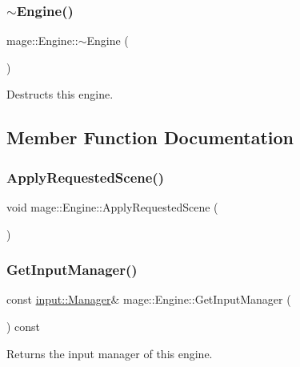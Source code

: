 \subsubsection{\texorpdfstring{$\sim$\+Engine()}{~Engine()}}
{\footnotesize\ttfamily mage\+::\+Engine\+::$\sim$\+Engine (\begin{DoxyParamCaption}{ }\end{DoxyParamCaption})}

Destructs this engine. 

\subsection{Member Function Documentation}
\hypertarget{classmage_1_1_engine_a4fcb9760814dfa59c9fff34f1c82357b}{}\label{classmage_1_1_engine_a4fcb9760814dfa59c9fff34f1c82357b} 
\subsubsection{\texorpdfstring{Apply\+Requested\+Scene()}{ApplyRequestedScene()}}
{\footnotesize\ttfamily void mage\+::\+Engine\+::\+Apply\+Requested\+Scene (\begin{DoxyParamCaption}{ }\end{DoxyParamCaption})\hspace{0.3cm}{\ttfamily [private]}}

\hypertarget{classmage_1_1_engine_ae5b542540511190eb6d284bf3e6ab54c}{}\label{classmage_1_1_engine_ae5b542540511190eb6d284bf3e6ab54c} 
\subsubsection{\texorpdfstring{Get\+Input\+Manager()}{GetInputManager()}}
{\footnotesize\ttfamily const \hyperlink{classmage_1_1input_1_1_manager}{input\+::\+Manager}\& mage\+::\+Engine\+::\+Get\+Input\+Manager (\begin{DoxyParamCaption}{ }\end{DoxyParamCaption}) const\hspace{0.3cm}{\ttfamily [noexcept]}}

Returns the input manager of this engine.

